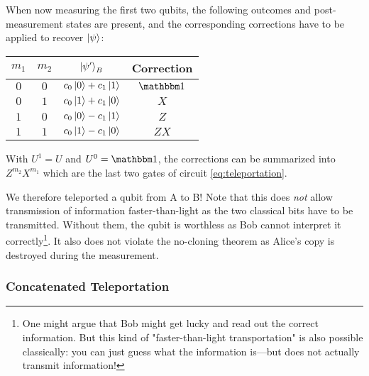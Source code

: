 			When now measuring the first two qubits, the following outcomes and post-measurement states are present, and the corresponding corrections have to be applied to recover \(\ket{\psi}\):
			\begin{center}
				\centering
				\begin{tabular}{cc|c|c}
					\(m_1\) & \(m_2\) & \(\ket{\psi'}_B\)               & Correction \\ \midrule
					\(0\)   & \(0\)   & \( c_0 \ket{0} + c_1 \ket{1} \) & \(\ID\)    \\
					\(0\)   & \(1\)   & \( c_0 \ket{1} + c_1 \ket{0} \) & \(X\)      \\
					\(1\)   & \(0\)   & \( c_0 \ket{0} - c_1 \ket{1} \) & \(Z\)      \\
					\(1\)   & \(1\)   & \( c_0 \ket{1} - c_1 \ket{0} \) & \(ZX\)
				\end{tabular}
			\end{center}
			With \( U^1 = U \) and \( U^0 = \ID \), the corrections can be summarized into \( Z^{m_2} X^{m_1} \) which are the last two gates of circuit \eqref{eq:teleportation}.

			We therefore teleported a qubit from A to B! Note that this does \emph{not} allow transmission of information faster-than-light as the two classical bits have to be transmitted. Without them, the qubit is worthless as Bob cannot interpret it correctly\footnote{One might argue that Bob might get lucky and read out the correct information. But this kind of "faster-than-light transportation" is also possible classically: you can just guess what the information is---but does not actually transmit information!}. It also does not violate the no-cloning theorem as Alice's copy is destroyed during the measurement.

			\subsubsection{Concatenated Teleportation}

